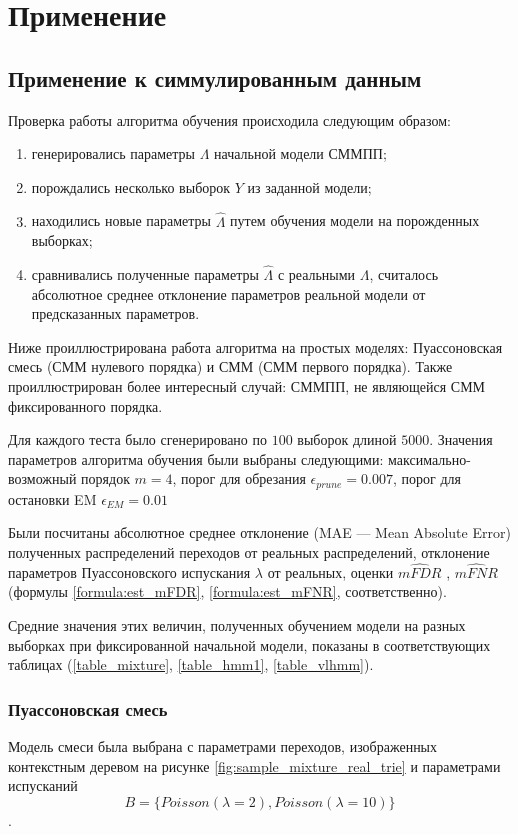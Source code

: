 \documentclass{matmex-diploma-custom}
\begin{document}
\section{Применение}
\subsection{Применение к симмулированным данным}
Проверка работы алгоритма обучения происходила следующим образом:
\begin{enumerate}
\item
генерировались параметры $\Lambda$ начальной модели СММПП;
\item
порождались несколько выборок $ Y $ из заданной модели;
\item
находились новые параметры $\hat{\Lambda}$ путем обучения модели на порожденных выборках;
\item
сравнивались полученные параметры $\hat{\Lambda}$ с реальными $\Lambda$,
считалось абсолютное среднее отклонение параметров реальной модели от предсказанных параметров. 
\end{enumerate}

Ниже проиллюстрирована работа алгоритма на простых моделях: Пуассоновская смесь (СММ нулевого порядка) и СММ (СММ первого порядка). Также проиллюстрирован более интересный случай: СММПП, не являющейся СММ фиксированного порядка.

Для каждого теста было сгенерировано по $100$ выборок длиной $5000$.
Значения параметров алгоритма обучения были выбраны следующими: максимально-возможный порядок $m=4$, порог для обрезания $ \epsilon_{\textit{prune}} = 0.007$, порог для остановки EM $\epsilon_{\textit{EM}} =  0.01 $ 

Были посчитаны абсолютное среднее отклонение (MAE --- Mean Absolute Error) полученных распределений переходов от реальных распределений, отклонение параметров Пуассоновского испускания $\lambda$ от реальных, оценки $\hat{\textit{mFDR}}$ ,  $\hat{\textit{mFNR}}$ (формулы \ref{formula:est_mFDR}, \ref{formula:est_mFNR}, соответственно).

Средние значения этих величин, полученных обучением модели на разных выборках при фиксированной начальной модели, показаны в соответствующих таблицах (\ref{table_mixture}, \ref{table_hmm1}, \ref{table_vlhmm}).

\subsubsection{Пуассоновская смесь}
Модель смеси была выбрана с параметрами переходов, изображенных контекстным деревом на рисунке \ref{fig:sample_mixture_real_trie} и параметрами испусканий
$$B = \{\textit{Poisson}(\lambda=2), \textit{Poisson}(\lambda=10)\}$$.
\end{document}
